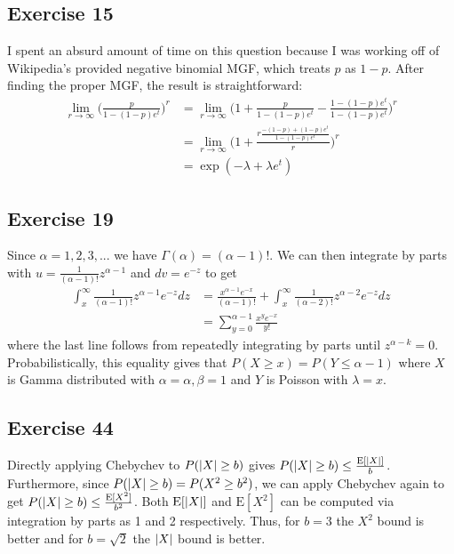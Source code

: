 \subsection{Exercise 15}
I spent an absurd amount of time on this question because I was working off of Wikipedia's provided negative
binomial MGF, which treats $p$ as $1 - p$. After finding the proper MGF, the result is straightforward: 
\begin{align*}
        \lim_{r \to \infty} \bigg(\frac{p}{1 - (1 - p)e^t}\bigg)^r &= 
        \lim_{r \to \infty}\bigg(1 + \frac{p}{1 - (1 - p)e^t} - \frac{1 - (1 - p)e^t}{1 - (1 - p)e^t}\bigg)^r \\
                                                                   &= \lim_{r \to \infty} \bigg(1 + \frac{r\frac{-(1 - p) + (1 - p)e^t}{1 - (1 - p)e^t}}{r}\bigg)^r \\
                                                                   &= \exp(-\lambda + \lambda e^t)
\end{align*}

\subsection{Exercise 19}
Since $\alpha = 1, 2, 3, ...$ we have $\Gamma(\alpha) = (\alpha - 1)!$. We can then integrate by parts with 
$u = \frac{1}{(\alpha - 1)!} z^{\alpha - 1}$ and $dv = e^{-z}$ to get
\begin{align*}
        \int_{x}^{\infty} \frac{1}{(\alpha - 1)!} z^{\alpha - 1} e^{-z} dz &= \frac{x^{\alpha - 1} e^{-x}}{(\alpha - 1)!} + \int_{x}^{\infty} \frac{1}{(\alpha - 2)!} z^{\alpha - 2} e^{-z} dz \\
                                                                           &= \sum_{y = 0}^{\alpha - 1} \frac{x^y e^{-x}}{y!}
\end{align*}
where the last line follows from repeatedly integrating by parts until $z^{\alpha - k} = 0$. Probabilistically,
this equality gives that $P(X \geq x) = P(Y \leq \alpha - 1)$ where $X$ is Gamma distributed with 
 $\alpha = \alpha, \beta = 1$ and $Y$ is Poisson with $\lambda = x$.

\subsection{Exercise 44}
Directly applying Chebychev to $P(\abs{X} \geq b)$ gives $P(\abs{X} \geq b) \leq \frac{\mathrm{E}[\abs{X}]}{b}$.
Furthermore, since $P(\abs{X} \geq b) = P(X^2 \geq b^2)$, we can apply Chebychev again to get
$P(\abs{X} \geq b) \leq \frac{\mathrm{E} [X^2]}{b^2}$. Both $\mathrm{E} [\abs{X}]$ and $\mathrm{E} [X^2]$ 
can be computed via integration by parts as 1 and 2 respectively. Thus, for $b = 3$ the $X^2$ bound is
better and for  $b = \sqrt{2}$ the $\abs{X}$ bound is better.

